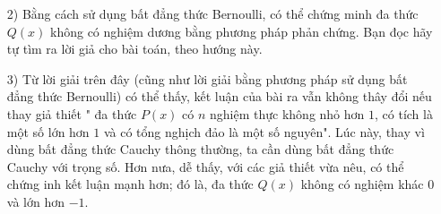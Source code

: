 \begin{bt}
{\begin{nx}
\begin{enumerate}
	\item [2)]  Bằng cách sử dụng bất đẳng thức Bernoulli, có thể chứng minh đa thức $ Q(x) $ không có nghiệm dương bằng phương pháp phản chứng. Bạn đọc hãy tự tìm ra lời giả cho bài toán, theo hướng này.
\item [3)]  Từ lời giải trên đây (cũng như lời giải bằng phương pháp sử dụng bất đẳng thức Bernoulli) có thể thấy, kết luận của bài ra vẫn không thây đổi nếu thay giả thiết " đa thức $ P(x) $ có $ n $ nghiệm thực không nhỏ hơn $ 1 $, có tích là một số lớn hơn $ 1 $ và có tổng nghịch đảo là một số nguyên". Lúc  này, thay vì dùng bất đẳng thức Cauchy thông thường, ta cần dùng bất đẳng thức Cauchy với trọng số. Hơn nưa, dễ thấy, với các giả thiết vừa nêu, có thể chứng inh kết luận mạnh hơn; đó là, đa thức $ Q(x) $ không có nghiệm khác $ 0 $  và lớn hơn $ -1. $
\end{enumerate}
\end{nx}
	}
\end{bt}

